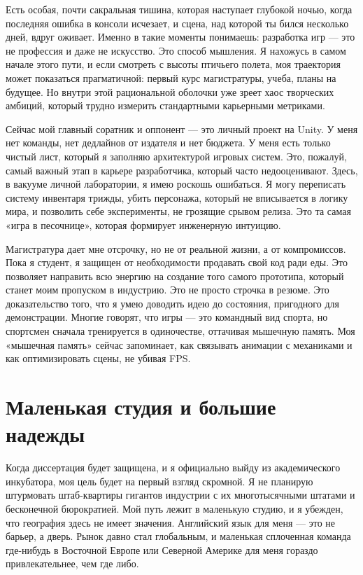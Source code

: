 \documentclass[14pt,a4paper]{extarticle}
\begin{document}
Есть особая, почти сакральная тишина, которая наступает глубокой ночью, когда
последняя ошибка в консоли исчезает, и сцена, над которой ты бился несколько
дней, вдруг оживает. Именно в такие моменты понимаешь: разработка игр — это не
профессия и даже не искусство. Это способ мышления. Я нахожусь в самом начале
этого пути, и если смотреть с высоты птичьего полета, моя траектория может
показаться прагматичной: первый курс магистратуры, учеба, планы на будущее. Но
внутри этой рациональной оболочки уже зреет хаос творческих амбиций, который
трудно измерить стандартными карьерными метриками.

Сейчас мой главный соратник и оппонент — это личный проект на Unity. У меня нет
команды, нет дедлайнов от издателя и нет бюджета. У меня есть только чистый
лист, который я заполняю архитектурой игровых систем. Это, пожалуй, самый
важный этап в карьере разработчика, который часто недооценивают. Здесь, в
вакууме личной лаборатории, я имею роскошь ошибаться. Я могу переписать систему
инвентаря трижды, убить персонажа, который не вписывается в логику мира, и
позволить себе эксперименты, не грозящие срывом релиза. Это та самая «игра в
песочнице», которая формирует инженерную интуицию.

Магистратура дает мне отсрочку, но не от реальной жизни, а от компромиссов.
Пока я студент, я защищен от необходимости продавать свой код ради еды. Это
позволяет направить всю энергию на создание того самого прототипа, который
станет моим пропуском в индустрию. Это не просто строчка в резюме. Это
доказательство того, что я умею доводить идею до состояния, пригодного для
демонстрации. Многие говорят, что игры — это командный вид спорта, но спортсмен
сначала тренируется в одиночестве, оттачивая мышечную память. Моя «мышечная
память» сейчас запоминает, как связывать анимации с механиками и как
оптимизировать сцены, не убивая FPS.

\section{Маленькая студия и большие надежды}

Когда диссертация будет защищена, и я официально выйду из академического
инкубатора, моя цель будет на первый взгляд скромной. Я не планирую штурмовать
штаб-квартиры гигантов индустрии с их многотысячными штатами и бесконечной
бюрократией. Мой путь лежит в маленькую студию, и я убежден, что география
здесь не имеет значения. Английский язык для меня — это не барьер, а дверь.
Рынок давно стал глобальным, и маленькая сплоченная команда где-нибудь в
Восточной Европе или Северной Америке для меня гораздо привлекательнее, чем
где либо.
\end{document}
